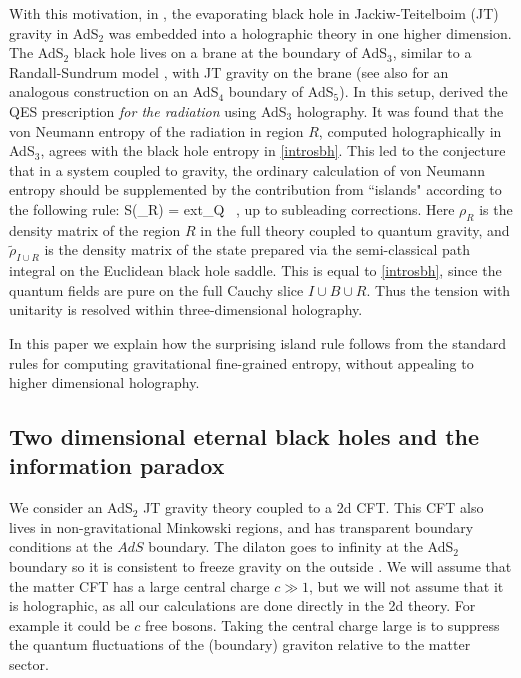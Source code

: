  With this motivation, in \cite{Almheiri:2019hni}, the evaporating black hole in Jackiw-Teitelboim (JT) gravity in AdS$_2$ was embedded into a holographic theory in one higher dimension. The AdS$_2$ black hole lives on a brane at the boundary of AdS$_3$, similar to a Randall-Sundrum model \cite{Randall:1999vf,Karch:2000ct}, with JT gravity on the brane (see also \cite{Almheiri:2019psy} for an analogous construction on an AdS$_4$ boundary of AdS$_5$). In this setup, \cite{Almheiri:2019hni} derived the QES prescription \textit{for the radiation} using AdS$_3$ holography. It was found that the von Neumann entropy of the radiation in region $R$, computed holographically in AdS$_3$, agrees with the black hole entropy in \eqref{introsbh}. This led to the conjecture that in a system coupled to gravity, the ordinary calculation of von Neumann entropy should be supplemented by the contribution from ``islands" according to the following rule:
\be {}
S(\rho_R) = \mbox{ext}_Q  \ ,
\ee
up to subleading corrections. Here $\rho_R$ is the density matrix of the region $R$ in the full theory coupled to quantum gravity, and $\tilde{\rho}_{I \cup R}$ is the density matrix of the state prepared via the semi-classical path integral on the Euclidean black hole saddle.
This is equal to \eqref{introsbh}, since the quantum fields are pure on the full Cauchy slice $I \cup B \cup R$. Thus the tension with unitarity is resolved within three-dimensional holography.

In this paper we explain how the surprising island rule  follows from the standard rules for computing gravitational fine-grained entropy,   without appealing to   higher dimensional holography. 



\subsection{Two dimensional eternal black holes and the information paradox}

We consider an AdS$_2$   JT gravity theory coupled to a 2d CFT. This CFT also lives in   non-gravitational Minkowski regions, and has transparent boundary conditions at the $AdS$ boundary. 
 The dilaton goes to infinity at the AdS$_2$ boundary so it is consistent to freeze gravity on the outside \cite{Engelsoy:2016xyb,Almheiri:2019psf}. We will assume that the matter CFT has a large central charge $c \gg 1$, but we will not assume that it is holographic, as all our calculations are done directly in the 2d theory. For example it could be $c$ free bosons. Taking the central charge large is to suppress the quantum fluctuations of the (boundary) graviton relative to the matter sector. 

